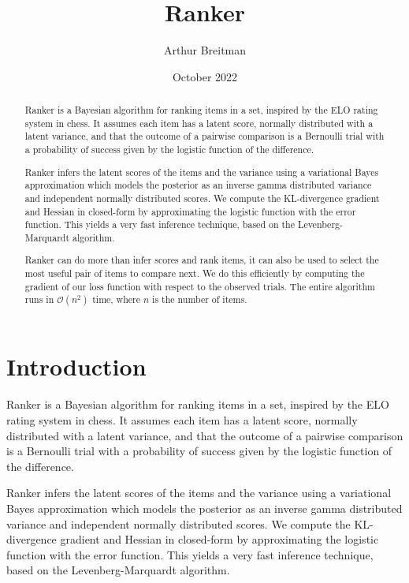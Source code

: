 \documentclass[12pt]{article}
\begin{document}
\title{Ranker}
\author{Arthur Breitman}
\date{October 2022}
\maketitle
\begin{abstract}
    Ranker is a Bayesian algorithm for ranking items in a set, inspired by the ELO rating
    system in chess. It assumes each item has a latent score, normally distributed
    with a latent variance, and that the outcome of a pairwise comparison is a Bernoulli
    trial with a probability of success given by the logistic function of the difference.

    Ranker infers the latent scores of the items and the variance using a variational
    Bayes approximation which models the posterior as an inverse gamma distributed variance
    and independent normally distributed scores. We compute the KL-divergence gradient and
    Hessian in closed-form by approximating the logistic function with the error function.
    This yields a very fast inference technique, based on the Levenberg-Marquardt algorithm.

    Ranker can do more than infer scores and rank items, it can also be used to select the
    most useful pair of items to compare next. We do this efficiently by computing the
    gradient of our loss function with respect to the observed trials. The entire algorithm
    runs in $\mathcal{O}(n^2)$ time, where $n$ is the number of items.
\end{abstract}

\section{Introduction}
    Ranker is a Bayesian algorithm for ranking items in a set, inspired by the ELO rating
    system in chess. It assumes each item has a latent score, normally distributed
    with a latent variance, and that the outcome of a pairwise comparison is a Bernoulli
    trial with a probability of success given by the logistic function of the difference.

    Ranker infers the latent scores of the items and the variance using a variational
    Bayes approximation which models the posterior as an inverse gamma distributed variance
    and independent normally distributed scores. We compute the KL-divergence gradient and
    Hessian in closed-form by approximating the logistic function with the error function.
    This yields a very fast inference technique, based on the Levenberg-Marquardt algorithm.
\end{document}
